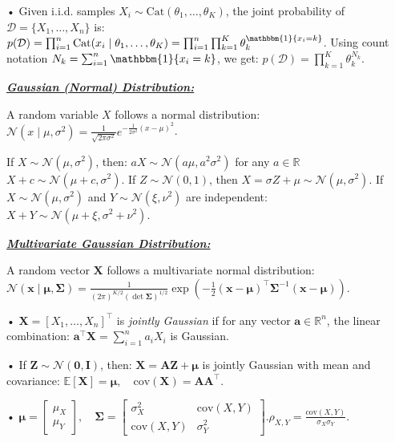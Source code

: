 \documentclass[10pt]{article}
\newcommand{\bulletPoint}[1]{\ul{\textit{\textbf{#1}}}}
\begin{document}
\begin{multicols*}{3}
• Given i.i.d. samples $X_i \sim \text{Cat}(\theta_1, \dots, \theta_K)$, the joint probability of $\mathcal{D} = \{X_1, \dots, X_n\}$ is: 
$p(\mathcal{D}) = \prod_{i=1}^{n} \text{Cat}(x_i \mid \theta_1, \dots, \theta_K) = \prod_{i=1}^{n} \prod_{k=1}^{K} \theta_k^{\mathbbm{1}\{x_i = k\}}$. 
Using count notation $N_k = \sum_{i=1}^{n} \mathbbm{1}\{x_i = k\}$, we get:
$p(\mathcal{D}) = \prod_{k=1}^{K} \theta_k^{N_k}$.


\bulletPoint{Gaussian (Normal) Distribution:} \quad

A random variable $X$ follows a normal distribution:
$\mathcal{N}(x \mid \mu, \sigma^2) = \frac{1}{\sqrt{2\pi\sigma^2}} e^{-\frac{1}{2\sigma^2} (x-\mu)^2}$.

If $X \sim \mathcal{N}(\mu, \sigma^2)$, then:
$aX \sim \mathcal{N}(a\mu, a^2\sigma^2)$ for any $a \in \mathbb{R}$
$X + c \sim \mathcal{N}(\mu + c, \sigma^2)$. 
If $Z \sim \mathcal{N}(0,1)$, then $X = \sigma Z + \mu \sim \mathcal{N}(\mu, \sigma^2)$. 
If $X \sim \mathcal{N}(\mu, \sigma^2)$ and $Y \sim \mathcal{N}(\xi, \nu^2)$ are independent:
$X + Y \sim \mathcal{N}(\mu + \xi, \sigma^2 + \nu^2)$.


\bulletPoint{Multivariate Gaussian Distribution:} \quad

A random vector $\mathbf{X}$ follows a multivariate normal distribution:
$\mathcal{N}(\mathbf{x} \mid \boldsymbol{\mu}, \boldsymbol{\Sigma}) = \frac{1}{(2\pi)^{K/2} (\det \boldsymbol{\Sigma})^{1/2}} \exp \left( -\frac{1}{2} (\mathbf{x} - \boldsymbol{\mu})^\top \boldsymbol{\Sigma}^{-1} (\mathbf{x} - \boldsymbol{\mu}) \right)$. 

• $\mathbf{X} = [X_1, \dots, X_n]^\top$ is \textit{jointly Gaussian} if for any vector $\mathbf{a} \in \mathbb{R}^n$, the linear combination: $\mathbf{a}^\top \mathbf{X} = \sum_{i=1}^{n} a_i X_i$ is Gaussian. 

• If $\mathbf{Z} \sim \mathcal{N}(\mathbf{0}, \mathbf{I})$, then: $\mathbf{X} = \mathbf{A} \mathbf{Z} + \boldsymbol{\mu}$  
is jointly Gaussian with mean and covariance: 
$\mathbb{E}[\mathbf{X}] = \boldsymbol{\mu}, \quad \text{cov}(\mathbf{X}) = \mathbf{A} \mathbf{A}^\top$. 

• $\boldsymbol{\mu} = 
\begin{bmatrix} \mu_X \\ \mu_Y \end{bmatrix}, \quad
\boldsymbol{\Sigma} = 
\begin{bmatrix} \sigma_X^2 & \text{cov}(X,Y) \\ \text{cov}(X,Y) & \sigma_Y^2 \end{bmatrix}$.\quad $\rho_{X,Y} = \frac{\text{cov}(X,Y)}{\sigma_X \sigma_Y}$.


\end{multicols*}
\end{document}
